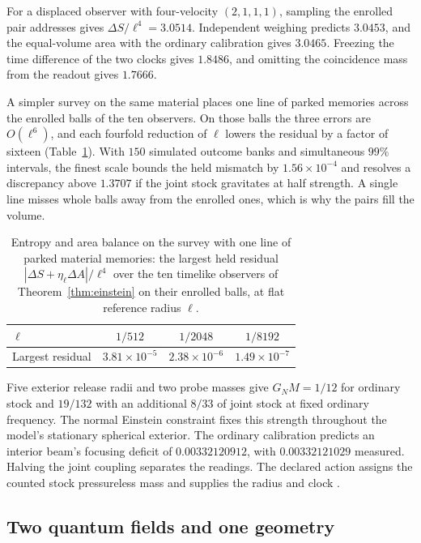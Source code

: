 \documentclass[11pt]{article}
\theoremstyle{definition}
\theoremstyle{remark}
\begin{document}
For a displaced observer with four-velocity $(2,1,1,1)$, sampling the
enrolled pair addresses gives $\Delta S/\ell^4=3.0514$. Independent
weighing predicts $3.0453$, and the equal-volume area with the ordinary
calibration gives $3.0465$. Freezing the time difference of the two
clocks gives $1.8486$, and omitting the coincidence mass from the readout
gives $1.7666$.

A simpler survey on the same material places one line of parked
memories across the enrolled balls of the ten observers. On those balls
the three errors are $O(\ell^6)$, and each fourfold reduction of $\ell$
lowers the residual by a factor of sixteen
(Table~\ref{tab:dust-balance}). With $150$ simulated outcome banks and
simultaneous $99\%$ intervals, the finest scale bounds the held mismatch
by $1.56\times10^{-4}$ and resolves a discrepancy above $1.3707$ if the
joint stock gravitates at half strength. A single line misses whole
balls away from the enrolled ones, which is why the pairs fill the
volume.

\begin{table}[htbp]
\centering\small
\caption{Entropy and area balance on the survey with one line of parked
material memories: the largest held residual
$|\Delta S+\eta_\ell\Delta A|/\ell^4$ over the ten timelike observers of
Theorem~\ref{thm:einstein} on their enrolled balls, at flat reference
radius $\ell$.}
\label{tab:dust-balance}
\begin{tabular}{@{}lccc@{}}
\toprule
$\ell$ & $1/512$ & $1/2048$ & $1/8192$\\
\midrule
Largest residual & $3.81\times10^{-5}$ & $2.38\times10^{-6}$ & $1.49\times10^{-7}$\\
\bottomrule
\end{tabular}
\end{table}

Five exterior release radii and two probe masses give \(G_NM=1/12\)
for ordinary stock and \(19/132\) with an additional \(8/33\) of joint
stock at fixed ordinary frequency. The normal Einstein constraint fixes
this strength throughout the model's stationary spherical exterior.
The ordinary calibration predicts an interior beam's focusing deficit
of \(0.00332120912\), with \(0.00332121029\) measured. Halving the joint
coupling separates the readings. The declared action assigns the counted
stock pressureless mass and supplies the radius and clock
\cite{ophEinstein}.

\subsection{Two quantum fields and one geometry}
\label{sec:einstein-fields}
\end{document}
